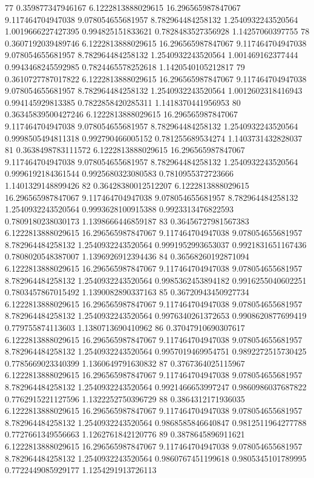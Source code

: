 {77 0.359877347946167 6.1222813888029615 16.296565987847067 9.117464704947038 9.078054655681957 8.782964484258132 1.2540932243520564 1.0019666227427395 0.994825151833621 0.7828483527356928 1.14257060397755
78 0.3607192039489746 6.1222813888029615 16.296565987847067 9.117464704947038 9.078054655681957 8.782964484258132 1.2540932243520564 1.001469162377444 0.9943468245592985 0.7824465578252618 1.1420540105212817
79 0.3610727787017822 6.1222813888029615 16.296565987847067 9.117464704947038 9.078054655681957 8.782964484258132 1.2540932243520564 1.0012602318416943 0.994145929813385 0.7822858420285311 1.1418370441956953
80 0.36345839500427246 6.1222813888029615 16.296565987847067 9.117464704947038 9.078054655681957 8.782964484258132 1.2540932243520564 0.9998505494811318 0.992790466005152 0.781255689534274 1.1403731432828037
81 0.3638498783111572 6.1222813888029615 16.296565987847067 9.117464704947038 9.078054655681957 8.782964484258132 1.2540932243520564 0.9996192184361544 0.9925680323080583 0.7810955372723666 1.1401329148899426
82 0.36428380012512207 6.1222813888029615 16.296565987847067 9.117464704947038 9.078054655681957 8.782964484258132 1.2540932243520564 0.9993628100915388 0.9923313476822593 0.7809180238030173 1.1398666446859187
83 0.36456727981567383 6.1222813888029615 16.296565987847067 9.117464704947038 9.078054655681957 8.782964484258132 1.2540932243520564 0.9991952993653037 0.9921831651167436 0.7808020548387007 1.1396926912394436
84 0.36568260192871094 6.1222813888029615 16.296565987847067 9.117464704947038 9.078054655681957 8.782964484258132 1.2540932243520564 0.9985362453894182 0.9916255040602251 0.7803457867015492 1.1390082890337163
85 0.36720943450927734 6.1222813888029615 16.296565987847067 9.117464704947038 9.078054655681957 8.782964484258132 1.2540932243520564 0.9976340261372653 0.9908620877699419 0.779755874113603 1.1380713690410962
86 0.37047910690307617 6.1222813888029615 16.296565987847067 9.117464704947038 9.078054655681957 8.782964484258132 1.2540932243520564 0.9957019469954751 0.9892272515730425 0.7785669023340399 1.1360649791630832
87 0.3767364025115967 6.1222813888029615 16.296565987847067 9.117464704947038 9.078054655681957 8.782964484258132 1.2540932243520564 0.9921466653997247 0.9860986037687822 0.7762915221127596 1.1322252750396729
88 0.3864312171936035 6.1222813888029615 16.296565987847067 9.117464704947038 9.078054655681957 8.782964484258132 1.2540932243520564 0.9868585846640847 0.9812511964277788 0.7727661349556663 1.1262761842120776
89 0.3878645896911621 6.1222813888029615 16.296565987847067 9.117464704947038 9.078054655681957 8.782964484258132 1.2540932243520564 0.9860767451199618 0.9805345101789995 0.7722449085929177 1.1254291913726113
}

